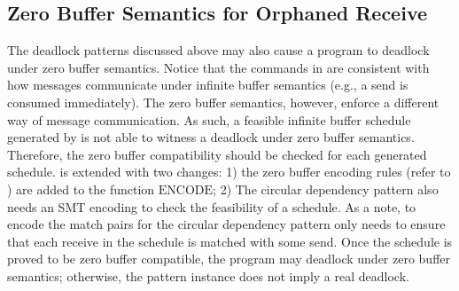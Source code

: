 \subsection{Zero Buffer Semantics for Orphaned Receive}
The deadlock patterns discussed above may also cause a program to deadlock under zero buffer semantics. Notice that the commands in  are consistent with how messages communicate under infinite buffer semantics (e.g., a send is consumed immediately). The zero buffer semantics, however, enforce a different way of message communication. As such, a feasible infinite buffer schedule generated by  is not able to witness a deadlock under zero buffer semantics. Therefore, the zero buffer compatibility should be checked for each generated schedule.  is extended with two changes: 1) the zero buffer encoding rules (refer to \cite{HuangNFM15}) are added to the function $\mathrm{ENCODE}$; 2) The circular dependency pattern also needs an SMT encoding to check the feasibility of a schedule. As a note, to encode the match pairs for the circular dependency pattern only needs to ensure that each receive in the schedule is matched with some send. Once the schedule is proved to be zero buffer compatible, the program may deadlock under zero buffer semantics; otherwise, the pattern instance does not imply a real deadlock. 

